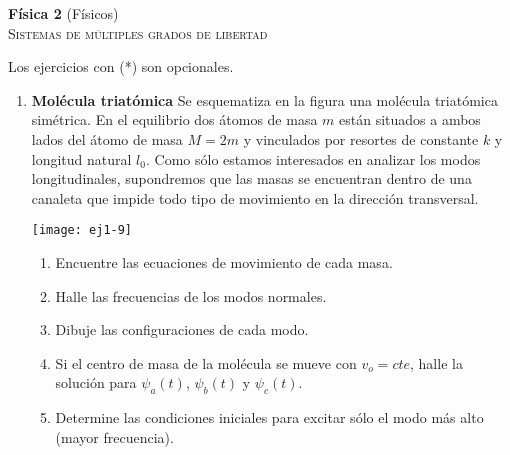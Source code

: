 \documentclass[11pt,spanish,a4paper]{article}
\begin{document}
\begin{center}
\textbf{Física 2} (Físicos) \hfill {}\\
	\textsc{\LARGE Sistemas de múltiples grados de libertad}
\end{center}

Los ejercicios con (*) son opcionales.

\begin{enumerate}


\section*{Modos normales de oscilación}


\item
\begin{minipage}[t][2.6cm]{0.7\textwidth}
\textbf{Molécula triatómica}
Se esquematiza en la figura una molécula triatómica simétrica.
En el equilibrio dos átomos de masa $m$ están situados a ambos lados del átomo de masa $M=2m$ y vinculados por resortes de constante $k$ y longitud natural $l_0$.
Como sólo estamos interesados en analizar los modos longitudinales, supondremos que las masas se encuentran dentro de una canaleta que impide todo tipo de movimiento en la dirección transversal.
\end{minipage}
\begin{minipage}[c][0cm][t]{0.25\textwidth}
  \texttt{[image: ej1-9]}
\end{minipage}
\begin{enumerate}
	\item Encuentre las ecuaciones de movimiento de cada masa. 
	\item Halle las frecuencias de los modos normales. 
	\item Dibuje las configuraciones de cada modo. 
\item Si el centro de masa de la molécula  se mueve con $v_o=cte$, halle la solución para $\psi_a(t)$, $\psi_b(t)$ y $\psi_c(t)$.
	\item Determine las condiciones iniciales para excitar sólo el modo más alto (mayor frecuencia).
\end{enumerate}




\end{enumerate}
\end{document}
